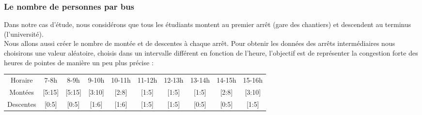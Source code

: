 \documentclass[a4paper,11pt]{article}
\begin{document}
		\subsubsection{Le nombre de personnes par bus}
		Dans notre cas d'étude, nous considérons que tous les étudiants montent au premier arrêt (gare des chantiers) et descendent au terminus (l'université).\\
		Nous allons aussi créer le nombre de montée et de descentes à chaque arrêt.
 		Pour obtenir les données des arrêts intermédiaires nous choisirons une valeur aléatoire, choisis dans un intervalle différent en fonction de l'heure, l'objectif est de représenter la congestion forte des heures de pointes de manière un peu plus précise : \\
 		\begin{tabular}{ | c | c | c | c | c | c | c | c | c | c |}
 			\hline			
   			Horaire & 7-8h & 8-9h & 9-10h & 10-11h & 11-12h & 12-13h & 13-14h & 14-15h & 15-16h\\
   			Montées & [5:15] & [5:15] & [3:10] & [2:8] & [1:5] & [1:5] & [1:5] & [2:8] & [3:10]\\
   			Descentes & [0:5] & [0:5] & [1:6] & [1:6] & [1:5] & [1:5] & [0:5] & [0:5] & [1:5]\\
 			\hline  
 		\end{tabular}\\
\end{document}

